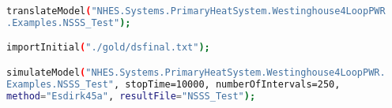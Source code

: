 \begin{lstlisting}[language=bash, basicstyle=\small]
translateModel("NHES.Systems.PrimaryHeatSystem.Westinghouse4LoopPWR
.Examples.NSSS_Test");

importInitial("./gold/dsfinal.txt");

simulateModel("NHES.Systems.PrimaryHeatSystem.Westinghouse4LoopPWR.
Examples.NSSS_Test", stopTime=10000, numberOfIntervals=250,
method="Esdirk45a", resultFile="NSSS_Test");
\end{lstlisting}